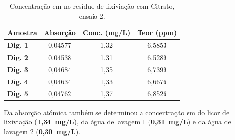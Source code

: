 \begin{table}[!ht]
    \centering
    \begin{tabularx}{\textwidth}{@{}lCCC@{}}
        \toprule
        \textbf{Amostra} & \textbf{Absorção} & \textbf{Conc. (mg/L)} & \textbf{Teor  (ppm)} \\ \midrule
        \textbf{Dig. 1} & 0,04577 & 1,32 & 6,5853 \\
        \textbf{Dig. 2} & 0,04538 & 1,31 & 6,5289 \\
        \textbf{Dig. 3} & 0,04684 & 1,35 & 6,7399 \\
        \textbf{Dig. 4} & 0,04634 & 1,33 & 6,6676 \\
        \textbf{Dig. 5} & 0,04762 & 1,37 & 6,8526 \\ \bottomrule
    \end{tabularx}
    \caption{Concentração em  no resíduo de lixiviação com Citrato, ensaio 2.}
    \label{tab:aas-concentracao-au-res-citrato2}
\end{table}

Da absorção atómica também se determinou a concentração em  do licor de lixiviação (\textbf{1,34~mg/L}), da água de lavagem 1 (\textbf{0,31~mg/L}) e da água de lavagem 2 (\textbf{0,30~mg/L}).

\hrulefill



